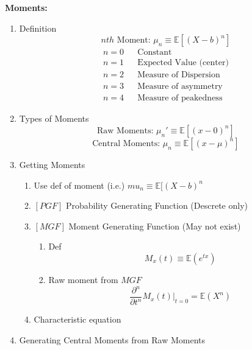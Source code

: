 \documentclass[12pt]{article}
\renewcommand{\=}[1]{\stackrel{#1}{=}} %
\theoremstyle{definition}
\theoremstyle{remark}
\begin{document}
\begin{enumerate}
\begin{equation}
  \end{equation}
  \newpage
  \textbf{Moments:}
  \begin{enumerate}
  \item Definition 
    \begin{equation}
      nth\textrm{ Moment: }\mu_n \equiv \mathbb{E}[(X-b)^n]
    \end{equation}
    \begin{align*}
      n = 0& & \textrm{Constant}\\
      n = 1& & \textrm{Expected Value (center)}\\
      n = 2& & \textrm{Measure of Dispersion}\\
      n = 3& & \textrm{Measure of asymmetry}\\
      n = 4& & \textrm{Measure of peakedness}
    \end{align*}
  \item Types of Moments
    \begin{equation}
      \textrm{Raw Moments: } \mu_n' \equiv \mathbb{E}[(x-0)^n]
    \end{equation}
    \begin{equation}
      \textrm{Central Moments: } \mu_n \equiv \mathbb{E}[(x-\mu)^n]
    \end{equation}
  \item Getting Moments
    \begin{enumerate}
    \item Use def of moment (i.e.) $mu_n \equiv \mathbb{E}[(X-b)^n$
    \item $[PGF]$ Probability Generating Function (Descrete only)
    \item $[MGF]$ Moment Generating Function (May not exist)
      \begin{enumerate}
      \item Def
        \begin{equation}
          M_x(t) \equiv \mathbb{E}(e^{tx})
        \end{equation}
      \item Raw moment from $MGF$
        \begin{equation}
          \frac{\partial^n}{\partial t^n} M_x(t)|_{t=0} = \mathbb{E}(X^n)
        \end{equation}
      \end{enumerate}
    \item Characteristic equation
    \end{enumerate}
  \item Generating Central Moments from Raw Moments

\end{enumerate}
\end{enumerate}
\end{document}
